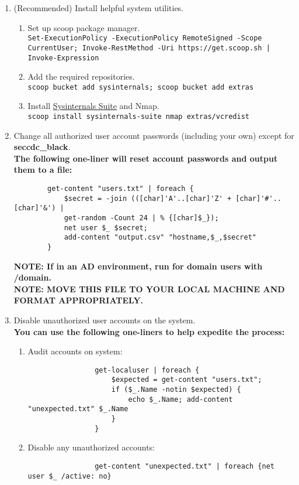\documentclass[12pt,letterpaper]{article}
\def\code#1{\textcolor{c2}{\texttt{#1}}}
\def\bf#1{\textbf{#1}}
\begin{document}
\begin{enumerate}
	\item (Recommended) Install helpful system utilities.
		\begin{enumerate}
			\item Set up scoop package manager. \\
				\code{Set-ExecutionPolicy -ExecutionPolicy RemoteSigned -Scope CurrentUser; Invoke-RestMethod -Uri https://get.scoop.sh | Invoke-Expression}
			\item Add the required repositories. \\
				\code{scoop bucket add sysinternals; scoop bucket add extras}
			\item Install \href{https://download.sysinternals.com/files/SysinternalsSuite.zip}{Sysinternals Suite} and Nmap. \\
				\code{scoop install sysinternals-suite nmap extras/vcredist}
		\end{enumerate}
	\item Change all authorized user account passwords (including your own) except for \bf{seccdc\_black}. \\
		\bf{The following one-liner will reset account passwords and output them to a file:}
		\begin{verbatim}
		get-content "users.txt" | foreach {
			$secret = -join (([char]'A'..[char]'Z' + [char]'#'..[char]'&') |
			get-random -Count 24 | % {[char]$_});
			net user $_ $secret;
			add-content "output.csv" "hostname,$_,$secret"
		}
		\end{verbatim}
	\bf{NOTE: If in an AD environment, run for domain users with /domain.} \\
	\bf{NOTE: MOVE THIS FILE TO YOUR LOCAL MACHINE AND FORMAT APPROPRIATELY.}
	\item Disable unauthorized user accounts on the system. \\
		\bf{You can use the following one-liners to help expedite the process:}
		\begin{enumerate}
			\item Audit accounts on system: 
				\begin{verbatim}
				get-localuser | foreach {
					$expected = get-content "users.txt";
					if ($_.Name -notin $expected) {
						echo $_.Name; add-content "unexpected.txt" $_.Name
					}
				}
				\end{verbatim}
			\item Disable any unauthorized accounts:
				\begin{verbatim}
				get-content "unexpected.txt" | foreach {net user $_ /active: no}

\end{verbatim}
\end{enumerate}
\end{enumerate}
\end{document}
